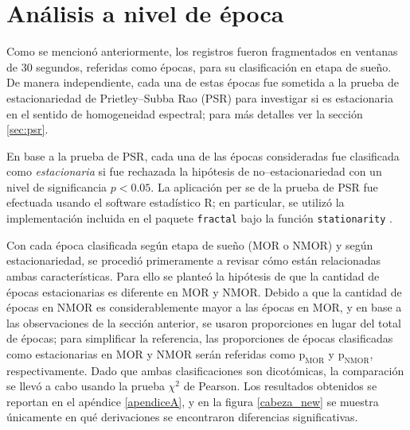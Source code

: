 \section{Análisis a nivel de época}
\label{sec:analisis_epoca}

Como se mencionó anteriormente, los registros fueron fragmentados en ventanas de 30 segundos, referidas como épocas, para su clasificación en etapa de sueño.
%
De manera independiente, cada una de estas épocas fue sometida a la prueba de estacionariedad de Prietley--Subba Rao (PSR) para investigar si es estacionaria en el sentido de homogeneidad espectral; para más detalles ver la sección \ref{sec:psr}.

En base a la prueba de PSR, cada una de las épocas consideradas fue clasificada como \textit{estacionaria} 
si fue rechazada la hipótesis de no--estacionariedad con un nivel de significancia $p<0.05$.
%
La aplicación per se de la prueba de PSR fue efectuada usando el software estadístico R; en particular, se utilizó la implementación incluida en el paquete \texttt{fractal} bajo la función \texttt{stationarity} \cite{R_fractal}.

%
%


Con cada época clasificada según etapa de sueño (MOR o NMOR) y según estacionariedad, se procedió primeramente a revisar cómo están relacionadas ambas características.
%
Para ello se planteó la hipótesis de que la cantidad de épocas estacionarias es diferente en MOR y NMOR. 
%
Debido a que la cantidad de épocas en NMOR es considerablemente mayor a las épocas en MOR, y en base a las observaciones de la sección anterior, se usaron proporciones en lugar del total de épocas;
para simplificar la referencia, las proporciones de épocas clasificadas como estacionarias en MOR y NMOR serán referidas como $\text{p}_{\text{MOR}}$ y $\text{p}_{\text{NMOR}}$, respectivamente.
%
Dado que ambas clasificaciones son dicotómicas, la comparación se llevó a cabo usando la prueba $\chi^{2}$ de Pearson.
%
Los resultados obtenidos se reportan en el apéndice \ref{apendiceA}, y en la figura \ref{cabeza_new} se muestra únicamente en qué derivaciones se encontraron diferencias significativas.

